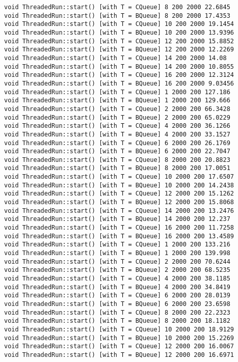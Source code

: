 \begin{verbatim}
void ThreadedRun::start() [with T = CQueue] 8 200 2000 22.6845
void ThreadedRun::start() [with T = BQueue] 8 200 2000 17.4353
void ThreadedRun::start() [with T = CQueue] 10 200 2000 19.1454
void ThreadedRun::start() [with T = BQueue] 10 200 2000 13.9396
void ThreadedRun::start() [with T = CQueue] 12 200 2000 15.8852
void ThreadedRun::start() [with T = BQueue] 12 200 2000 12.2269
void ThreadedRun::start() [with T = CQueue] 14 200 2000 14.08
void ThreadedRun::start() [with T = BQueue] 14 200 2000 10.8055
void ThreadedRun::start() [with T = CQueue] 16 200 2000 12.3124
void ThreadedRun::start() [with T = BQueue] 16 200 2000 9.03456
void ThreadedRun::start() [with T = CQueue] 1 2000 200 127.186
void ThreadedRun::start() [with T = BQueue] 1 2000 200 129.666
void ThreadedRun::start() [with T = CQueue] 2 2000 200 66.3428
void ThreadedRun::start() [with T = BQueue] 2 2000 200 65.0229
void ThreadedRun::start() [with T = CQueue] 4 2000 200 36.1266
void ThreadedRun::start() [with T = BQueue] 4 2000 200 33.1527
void ThreadedRun::start() [with T = CQueue] 6 2000 200 26.1769
void ThreadedRun::start() [with T = BQueue] 6 2000 200 22.7047
void ThreadedRun::start() [with T = CQueue] 8 2000 200 20.8823
void ThreadedRun::start() [with T = BQueue] 8 2000 200 17.0051
void ThreadedRun::start() [with T = CQueue] 10 2000 200 17.6507
void ThreadedRun::start() [with T = BQueue] 10 2000 200 14.2438
void ThreadedRun::start() [with T = CQueue] 12 2000 200 15.1262
void ThreadedRun::start() [with T = BQueue] 12 2000 200 15.8068
void ThreadedRun::start() [with T = CQueue] 14 2000 200 13.2476
void ThreadedRun::start() [with T = BQueue] 14 2000 200 12.237
void ThreadedRun::start() [with T = CQueue] 16 2000 200 11.7258
void ThreadedRun::start() [with T = BQueue] 16 2000 200 13.4589
void ThreadedRun::start() [with T = CQueue] 1 2000 200 133.216
void ThreadedRun::start() [with T = BQueue] 1 2000 200 139.998
void ThreadedRun::start() [with T = CQueue] 2 2000 200 70.6244
void ThreadedRun::start() [with T = BQueue] 2 2000 200 68.5235
void ThreadedRun::start() [with T = CQueue] 4 2000 200 38.1185
void ThreadedRun::start() [with T = BQueue] 4 2000 200 34.8419
void ThreadedRun::start() [with T = CQueue] 6 2000 200 28.0139
void ThreadedRun::start() [with T = BQueue] 6 2000 200 23.6598
void ThreadedRun::start() [with T = CQueue] 8 2000 200 22.2323
void ThreadedRun::start() [with T = BQueue] 8 2000 200 18.1182
void ThreadedRun::start() [with T = CQueue] 10 2000 200 18.9129
void ThreadedRun::start() [with T = BQueue] 10 2000 200 15.2269
void ThreadedRun::start() [with T = CQueue] 12 2000 200 16.0067
void ThreadedRun::start() [with T = BQueue] 12 2000 200 16.6971

\end{verbatim}
